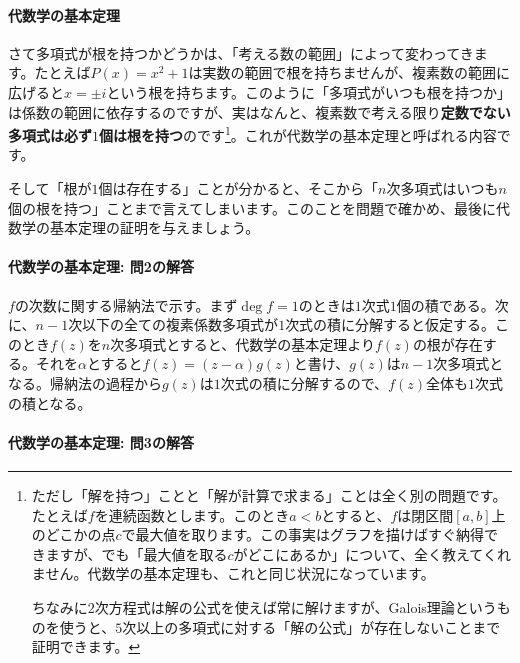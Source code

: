\paragraph{代数学の基本定理}

さて多項式が根を持つかどうかは、「考える数の範囲」によって変わってきます。たとえば$P(x)=x^2+1$は実数の範囲で根を持ちませんが、複素数の範囲に広げると$x=\pm i$という根を持ちます。このように「多項式がいつも根を持つか」は係数の範囲に依存するのですが、実はなんと、複素数で考える限り\textbf{定数でない多項式は必ず$1$個は根を持つ}のです\footnote{ただし「解を持つ」ことと「解が計算で求まる」ことは全く別の問題です。たとえば$f$を連続函数とします。このとき$a<b$とすると、$f$は閉区間$[a,b]$上のどこかの点$c$で最大値を取ります。この事実はグラフを描けばすぐ納得できますが、でも「最大値を取る$c$がどこにあるか」について、全く教えてくれません。代数学の基本定理も、これと同じ状況になっています。

ちなみに$2$次方程式は解の公式を使えば常に解けますが、Galois理論というものを使うと、$5$次以上の多項式に対する「解の公式」が存在しないことまで証明できます。}。これが代数学の基本定理と呼ばれる内容です。

そして「根が$1$個は存在する」ことが分かると、そこから「$n$次多項式はいつも$n$個の根を持つ」ことまで言えてしまいます。このことを問題で確かめ、最後に代数学の基本定理の証明を与えましょう。



\paragraph{代数学の基本定理: 問2の解答}
$f$の次数に関する帰納法で示す。まず$\deg f=1$のときは$1$次式$1$個の積である。次に、$n-1$次以下の全ての複素係数多項式が$1$次式の積に分解すると仮定する。このとき$f(z)$を$n$次多項式とすると、代数学の基本定理より$f(z)$の根が存在する。それを$\alpha$とすると$f(z)=(z-\alpha)g(z)$と書け、$g(z)$は$n-1$次多項式となる。帰納法の過程から$g(z)$は$1$次式の積に分解するので、$f(z)$全体も$1$次式の積となる。


\paragraph{代数学の基本定理: 問3の解答}


